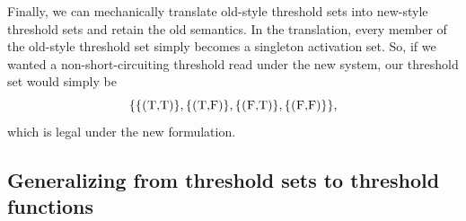 
Finally, we can mechanically translate old-style threshold sets into
new-style threshold sets and retain the old semantics.  In the
translation, every member of the old-style threshold set simply
becomes a singleton activation set. So, if we wanted a
non-short-circuiting threshold read under the new system, our
threshold set would simply be
\[
\{ 
\{ \textrm{\il{(T,T)}} \},
\{ \textrm{\il{(T,F)}} \},
\{ \textrm{\il{(F,T)}} \},
\{ \textrm{\il{(F,F)}} \}
\},
\]
which is legal under the new formulation.

\subsection{Generalizing from threshold sets to threshold functions}\label{subsection:lvars-generalizing-from-threshold-sets-to-threshold-functions}


